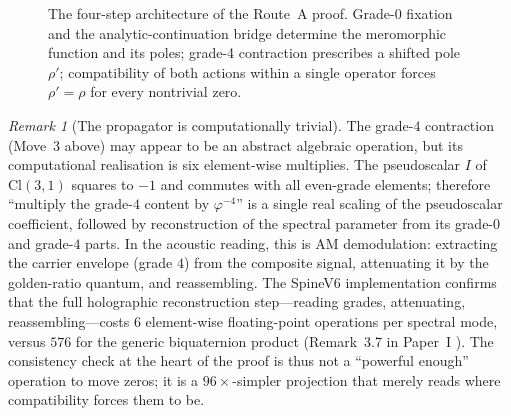 \documentclass[11pt,a4paper]{article}
\theoremstyle{plain}
\theoremstyle{definition}
\theoremstyle{remark}
\newtheorem{remark}[theorem]{Remark}
\numberwithin{equation}{section}
\providecommand{\Cl}{\mathrm{Cl}}
\providecommand{\vp}{\varphi}
\begin{document}
\begin{figure}[htbp]
\centering
{}
\caption{The four-step architecture of the Route~A proof.  Grade-0
fixation and the analytic-continuation bridge determine the
meromorphic function and its poles; grade-4 contraction prescribes
a shifted pole $\rho'$; compatibility of both actions within a
single operator forces $\rho'=\rho$ for every nontrivial zero.}
\label{fig:proof-architecture}
\end{figure}

\begin{remark}[The propagator is computationally trivial]
\label{rmk:propagator-trivial}
The grade-$4$ contraction (Move~3 above) may appear to be an
abstract algebraic operation, but its computational realisation
is six element-wise multiplies.  The pseudoscalar $I$ of
$\Cl(3,1)$ squares to $-1$ and commutes with all even-grade
elements; therefore ``multiply the grade-$4$ content by
$\vp^{-4}$'' is a single real scaling of the pseudoscalar
coefficient, followed by reconstruction of the spectral parameter
from its grade-$0$ and grade-$4$ parts.  In the acoustic reading,
this is AM demodulation: extracting the carrier envelope
(grade $4$) from the composite signal, attenuating it by the
golden-ratio quantum, and reassembling.  The SpineV6
implementation confirms that the full holographic reconstruction
step---reading grades, attenuating, reassembling---costs $6$
element-wise floating-point operations per spectral mode, versus
$576$ for the generic biquaternion product
(Remark~3.7 in Paper~I \cite[Rmk.~3.7]{paper-I-substrate}).
The consistency check at the heart of the proof is thus not a
``powerful enough'' operation to move zeros; it is
a $96\times$-simpler projection that merely reads where
compatibility forces them to be.
\end{remark}
\end{document}
